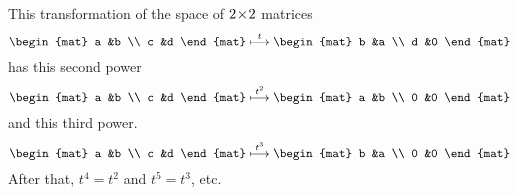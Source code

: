 \begin{example}
This transformation of the space of $2 \! \times \! 2$ matrices
\begin{equation*}
  \begin{mat}
    a  &b  \\
    c  &d
  \end{mat}
  \mapsunder{t}
  \begin{mat}
    b  &a  \\
    d  &0
  \end{mat}
\end{equation*}
has this second power
\begin{equation*}
  \begin{mat}
    a  &b  \\
    c  &d
  \end{mat}
  \mapsunder{t^2}
  \begin{mat}
    a  &b  \\
    0  &0
  \end{mat}
\end{equation*}
and this third power.
\begin{equation*}
  \begin{mat}
    a  &b  \\
    c  &d
  \end{mat}
  \mapsunder{t^3}
  \begin{mat}
    b  &a  \\
    0  &0
  \end{mat}
\end{equation*}
After that, $t^4=t^2$ and $t^5=t^3$, etc.
\end{example}

